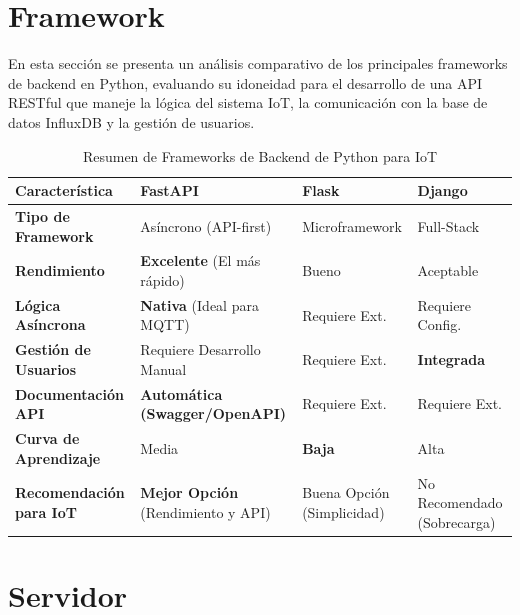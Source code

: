 \section{Framework}
En esta sección se presenta un análisis comparativo de los principales frameworks de backend en Python, evaluando su idoneidad para el desarrollo de una API RESTful que maneje la lógica del sistema IoT, la comunicación con la base de datos InfluxDB y la gestión de usuarios.
\begin{table}[h]
    \centering
    \caption{Resumen de Frameworks de Backend de Python para IoT}
    \label{tab:backend_resumen}
    \begin{tabular}{|l|l|l|l|}
        \hline
        \textbf{Característica} & \textbf{FastAPI}  & \textbf{Flask}  & \textbf{Django} \\
        \hline
        \textbf{Tipo de Framework} & Asíncrono (API-first) & Microframework & Full-Stack \\
        \hline
        \textbf{Rendimiento} & \textbf{Excelente} (El más rápido) & Bueno & Aceptable \\
        \hline
        \textbf{Lógica Asíncrona} & \textbf{Nativa} (Ideal para MQTT) & Requiere Ext. & Requiere Config. \\
        \hline
        \textbf{Gestión de Usuarios} & Requiere Desarrollo Manual & Requiere Ext. & \textbf{Integrada} \\
        \hline
        \textbf{Documentación API} & \textbf{Automática (Swagger/OpenAPI)} & Requiere Ext. & Requiere Ext. \\
        \hline
        \textbf{Curva de Aprendizaje} & Media & \textbf{Baja} & Alta \\
        \hline
        \textbf{Recomendación para IoT} & \textbf{Mejor Opción} (Rendimiento y API) & Buena Opción (Simplicidad) & No Recomendado (Sobrecarga) \\
        \hline
    \end{tabular}
\end{table}
\section{Servidor}




